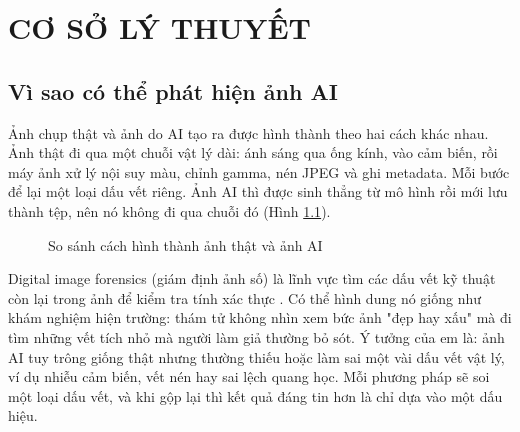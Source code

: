 \chapter{CƠ SỞ LÝ THUYẾT}

\section{Vì sao có thể phát hiện ảnh AI}
Ảnh chụp thật và ảnh do AI tạo ra được hình thành theo hai cách khác nhau. Ảnh thật đi qua một chuỗi vật lý dài: ánh sáng qua ống kính, vào cảm biến, rồi máy ảnh xử lý nội suy màu, chỉnh gamma, nén JPEG và ghi metadata. Mỗi bước để lại một loại dấu vết riêng. Ảnh AI thì được sinh thẳng từ mô hình rồi mới lưu thành tệp, nên nó không đi qua chuỗi đó (Hình \ref{fig:pipeline-compare}).

\begin{figure}[H]
\centering
{}
\caption{So sánh cách hình thành ảnh thật và ảnh AI}
\label{fig:pipeline-compare}
\end{figure}

Digital image forensics (giám định ảnh số) là lĩnh vực tìm các dấu vết kỹ thuật còn lại trong ảnh để kiểm tra tính xác thực \cite{farid,verdoliva}. Có thể hình dung nó giống như khám nghiệm hiện trường: thám tử không nhìn xem bức ảnh "đẹp hay xấu" mà đi tìm những vết tích nhỏ mà người làm giả thường bỏ sót. Ý tưởng của em là: ảnh AI tuy trông giống thật nhưng thường thiếu hoặc làm sai một vài dấu vết vật lý, ví dụ nhiễu cảm biến, vết nén hay sai lệch quang học. Mỗi phương pháp sẽ soi một loại dấu vết, và khi gộp lại thì kết quả đáng tin hơn là chỉ dựa vào một dấu hiệu.

